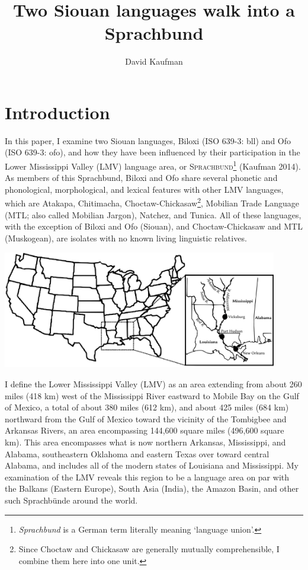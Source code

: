 \documentclass[output=paper]{LSP/langsci}
\author{David Kaufman}
\title{Two Siouan languages walk into a Sprachbund}
\begin{document}
\section{Introduction}
In this paper, I examine two Siouan languages, Biloxi (ISO 639-3: bll) and Ofo (ISO 639-3: ofo), and how they have been influenced by their participation in the Lower Mississippi Valley (LMV) language area, or \textsc{Sprachbund}\footnote{\emph{Sprachbund} is a German term literally meaning `language union'.} (Kaufman 2014). As members of this Sprachbund, Biloxi and Ofo share several phonetic and phonological, morphological, and lexical features with other LMV languages, which are Atakapa, Chitimacha, Choctaw-Chickasaw\footnote{Since Choctaw and Chickasaw are generally mutually comprehensible, I combine them here into one unit.}, Mobilian Trade Language (MTL; also called Mobilian Jargon), Natchez, and Tunica. All of these languages, with the exception of Biloxi and Ofo (Siouan), and Choctaw-Chickasaw and MTL (Muskogean), are isolates with no known living linguistic relatives.

\includegraphics[width=12cm]{figures/Kaufman1}

I define the Lower Mississippi Valley (LMV) as an area extending from about 260 miles (418 km) west of the Mississippi River eastward to Mobile Bay on the Gulf of Mexico, a total of about 380 miles (612 km), and about 425 miles (684 km) northward from the Gulf of Mexico toward the vicinity of the Tombigbee and Arkansas Rivers, an area encompassing 144,600 square miles (496,600 square km). This area encompasses what is now northern Arkansas, Mississippi, and Alabama, southeastern Oklahoma and eastern Texas over toward central Alabama, and includes all of the modern states of Louisiana and Mississippi. My examination of the LMV reveals this region to be a language area on par with the Balkans (Eastern Europe), South Asia (India), the Amazon Basin, and other such Sprachbünde around the world.
\end{document}
